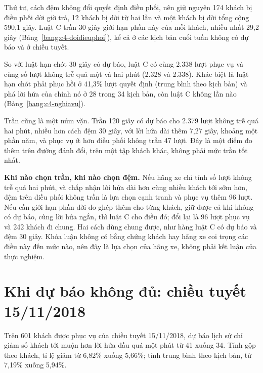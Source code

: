 Thứ tư, cách đệm không đổi quyết định điều phối, nên giữ nguyên 174 khách bị điều phối dời giờ trả, 12 khách bị dời
từ hai lần và một khách bị dời tổng cộng 590,1 giây. Luật C trần 30 giây giới hạn phần này của mỗi khách, nhiều nhất
29,2 giây (Bảng~\ref{bang:c4-doidieuphoi}), kể cả ở các kịch bản cuối tuần không có dự báo và ở chiều tuyết.

So với luật hạn chót 30 giây có dự báo, luật C có cùng 2.338 lượt phục vụ và cùng số lượt không trễ quá một và hai
phút (2.328 và 2.338). Khác biệt là luật hạn chót phải phục hồi ở 41,3\% lượt quyết định (trung bình theo kịch bản)
và phá lời hứa của chính nó ở 28 trong 34 kịch bản, còn luật C không lần nào (Bảng~\ref{bang:c4-nghiavu}).

Trần cũng là một núm vặn. Trần 120 giây có dự báo cho 2.379 lượt không trễ quá hai phút, nhiều hơn cách đệm 30 giây,
với lời hứa dài thêm 7,27 giây, khoảng một phần năm, và phục vụ ít hơn điều phối không trần 47 lượt. Đây là một điểm
đo thêm trên đường đánh đổi, trên một tập khách khác, không phải mức trần tốt nhất.

\textbf{Khi nào chọn trần, khi nào chọn đệm.} Nếu hãng xe chỉ tính số lượt không trễ quá hai phút, và chấp nhận lời
hứa dài hơn cùng nhiều khách tới sớm hơn, đệm trên điều phối không trần là lựa chọn cạnh tranh và phục vụ thêm 96
lượt. Nếu cần giới hạn phần dời do ghép thêm cho từng khách, giữ được cả khi không có dự báo, cùng lời hứa ngắn, thì
luật C cho điều đó; đổi lại là 96 lượt phục vụ và 242 khách đi chung. Hai cách dùng chung được, như hàng luật C có dự
báo và đệm 30 giây. Khóa luận không có bằng chứng khách hay hãng xe coi trọng các điều này đến mức nào, nên đây là lựa
chọn của hãng xe, không phải kết luận của thực nghiệm.

\section{Khi dự báo không đủ: chiều tuyết 15/11/2018}
\label{muc:c4-tuyet}

Trên 601 khách được phục vụ của chiều tuyết 15/11/2018, dự báo lịch sử chỉ giảm số khách tới muộn hơn lời hứa đầu
quá một phút từ 41 xuống 34. Tính gộp theo khách, tỉ lệ giảm từ 6,82\% xuống 5,66\%; tính trung bình theo kịch bản,
từ 7,19\% xuống 5,94\%.

